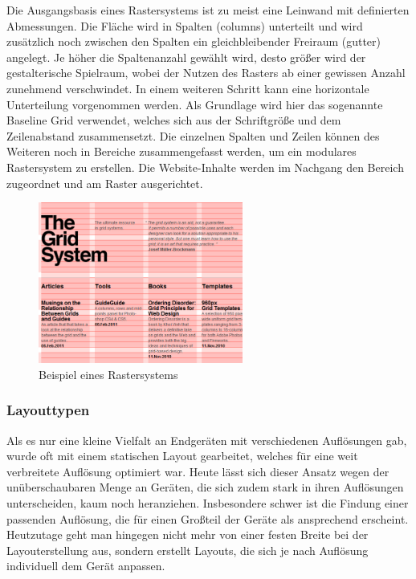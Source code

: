 Die Ausgangsbasis eines Rastersystems ist zu meist eine Leinwand mit definierten Abmessungen. Die Fläche wird in Spalten (\engl columns) unterteilt und \ggf wird zusätzlich noch zwischen den Spalten ein gleichbleibender Freiraum (\engl gutter) angelegt. Je höher die Spaltenanzahl gewählt wird, desto größer wird der gestalterische Spielraum, wobei der Nutzen des Rasters ab einer gewissen Anzahl zunehmend verschwindet.
In einem weiteren Schritt kann eine horizontale Unterteilung vorgenommen werden. Als Grundlage wird hier das sogenannte Baseline Grid verwendet, welches sich aus der Schriftgröße und dem Zeilenabstand zusammensetzt.
Die einzelnen Spalten und Zeilen können des Weiteren noch in Bereiche zusammengefasst werden, um ein modulares Rastersystem zu erstellen.
Die Website-Inhalte werden im Nachgang den Bereich zugeordnet und am Raster ausgerichtet.

\begin{figure}
    \centering
    \includegraphics[width=0.6\textwidth]{figures/jan/Wire_Gridsystem.jpeg}
    \caption[Beispiel eines Rastersystems]{Beispiel eines Rastersystems}
    \label{fig:image}
\end{figure}


\subsubsection*{Layouttypen}

Als es nur eine kleine Vielfalt an Endgeräten mit verschiedenen Auflösungen gab, wurde oft mit einem statischen Layout gearbeitet, welches für eine weit verbreitete Auflösung optimiert war. Heute lässt sich dieser Ansatz wegen der unüberschaubaren Menge an Geräten, die sich zudem stark in ihren Auflösungen unterscheiden, kaum noch heranziehen. Insbesondere schwer ist die Findung einer passenden Auflösung, die für einen Großteil der Geräte als ansprechend erscheint.
Heutzutage geht man hingegen nicht mehr von einer festen Breite bei der Layouterstellung aus, sondern erstellt Layouts, die sich je nach Auflösung individuell dem Gerät anpassen.

